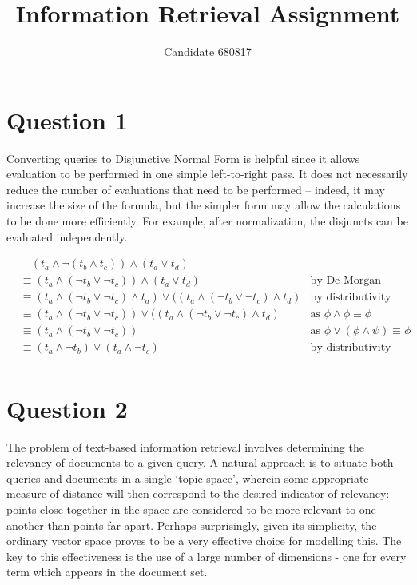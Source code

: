\documentclass[11pt]{article}
\begin{document}
\title{Information Retrieval Assignment}
\author{Candidate 680817}
\maketitle

\section*{Question 1}
Converting queries to Disjunctive Normal Form is helpful since it allows
evaluation to be performed in one simple left-to-right pass.  It does not
necessarily reduce the number of evaluations that need to be performed --
indeed, it may increase the size of the formula, but the simpler form may allow
the calculations to be done more efficiently. For example, after normalization,
the disjuncts can be evaluated independently. 

\begin{align*}
& \quad (t_a \wedge \neg (t_b \wedge t_c)) \wedge (t_a \vee t_d)                                                   & \\
& \equiv (t_a \wedge (\neg t_b \vee \neg t_c)) \wedge (t_a \vee t_d)                                               & \text{by De Morgan} \\
& \equiv (t_a \wedge (\neg t_b \vee \neg t_c) \wedge t_a) \vee ( (t_a \wedge (\neg t_b \vee \neg t_c) \wedge t_d ) & \text{by distributivity} \\
& \equiv (t_a \wedge (\neg t_b \vee \neg t_c)) \vee ( (t_a \wedge (\neg t_b \vee \neg t_c) \wedge t_d ) & \text{as } \phi \wedge \phi \equiv \phi \\
& \equiv (t_a \wedge (\neg t_b \vee \neg t_c)) & \text{as } \phi \vee (\phi \wedge \psi) \equiv \phi \\
& \equiv (t_a \wedge \neg t_b) \vee (t_a \wedge \neg t_c) & \text{by distributivity} \\
\end{align*}

\section*{Question 2}
The problem of text-based information retrieval involves determining the
relevancy of documents to a given query. A natural approach is to situate both
queries and documents in a single `topic space', wherein some appropriate
measure of distance will then correspond to the desired indicator of relevancy:
points close together in the space are considered to be more relevant to
one another than points far apart. Perhaps surprisingly, given its simplicity,
the ordinary vector space proves to be a very effective choice for modelling
this. The key to this effectiveness is the use of a large number of dimensions
- one for every term which appears in the document set.
\end{document}

